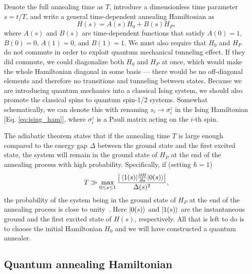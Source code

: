 \documentclass[12pt,a4paper]{article}
\newcommand{\pd}{\partial}
\begin{document}
\hspace*{0.3cm}
Denote the full annealing time as $T$, introduce a dimensionless time
parameter $s = t / T$, and write a general time-dependent annealing Hamiltonian as
\begin{equation}
    H(s) = A(s) H_0 + B(s) H_P,
    \label{eq:QA_ham}
\end{equation}
where $A(s)$ and $B(s)$ are time-dependent functions that satisfy $A(0) = 1$, $B(0) = 0$, $A(1) = 0$, and $B(1) = 1$.
We must also require that $H_0$ and $H_P$ do not commute in order to exploit quantum mechanical tunneling effect. If they did
commute, we could diagonalize both $H_0$ and $H_P$ at once, which would make the whole Hamiltonian diagonal
in some basis --- there would be no off-diagonal elements and therefore no transitions and tunneling between states.
Because we are introducing quantum mechanics into a classical Ising system,
we should also promote the classical spins to quantum spin-1/2 systems. Somewhat schematically, we can denote
this with renaming $s_i \to \sigma^z_i$ in the Ising Hamiltonian [Eq. \eqref{eq:ising_ham}], where $\sigma^z_i$ is a
Pauli matrix acting on the $i$-th spin.

\hspace*{0.3cm}
The adiabatic theorem states that if the annealing time $T$ is large enough compared to the
energy gap $\Delta$ between the ground state and the first excited state,
the system will remain in the ground state of $H_P$ at the end of the annealing process
with high probability. Specifically, if (setting $\hbar = 1$)
\begin{equation}
    T \gg \max_{0 \leq s \leq 1} \frac{\left| \mel{1(s)}{\frac{\pd H}{\pd s}}{0(s)} \right|}{\Delta(s)^2},
    \label{eq:adiabatic_theorem}
\end{equation}
the probability of the system being in the ground state of $H_P$ at the end of the annealing process
is close to unity~\cite{albash2018adiabatic}. Here $\ket{0(s)}$ and $\ket{1(s)}$ are the instantaneous ground and the
first excited state of $H(s)$, respectively. All that is left to do is to choose the initial Hamiltonian $H_0$
and we will have constructed a quantum annealer.


\subsection*{Quantum annealing Hamiltonian} \label{sec:qa_ham}
\end{document}
